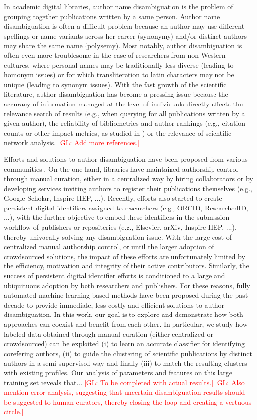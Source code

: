 \documentclass{article}
\newcommand{\glnote}[1]{\textcolor{red}{[GL: #1]}}
\begin{document}
In academic digital libraries, author name disambiguation is the problem of
grouping together publications written by a same person.  Author name
disambiguation is often a difficult problem because an author may use different
spellings or name variants across her career (synonymy) and/or distinct authors may
share the same name (polysemy). Most notably, author disambiguation is often even more
troublesome in the case of researchers from non-Western cultures, where
personal names may be traditionally less diverse (leading to homonym issues) or
for which transliteration to latin characters may not be unique (leading to
synonym issues). With the fast growth of the scientific literature, author
disambiguation has become a pressing issue because the accuracy of information
managed at the level of individuals directly affects the relevance search of
results (e.g., when querying for all publications written by a given author),
the reliability of bibliometrics and author rankings (e.g., citation counts or other impact
metrics, as studied in \citep{strotmann2012author}) or the relevance of scientific network analysis.
\glnote{Add more references.}

Efforts and solutions to author disambiguation have been proposed from various
communities \citep{liu2014author}. On the one hand, libraries have maintained
authorship control through manual curation, either in a centralized way by
hiring collaborators or by developing services inviting authors to register
their publications themselves (e.g., Google Scholar, Inspire-HEP, ...).
Recently, efforts also started to create persistent digital identifiers
assigned to researchers (e.g., ORCID, ResearchedID, ...), with the further
objective to embed these identifiers in the submission workflow of publishers
or repositeries (e.g., Elsevier, arXiv, Inspire-HEP, ...), thereby univocally
solving any disambiguation issue. With the large cost of centralized manual
authorship control, or until the larger adoption of crowdsourced solutions, the
impact of these efforts are unfortunately limited by the efficiency, motivation
and integrity of their active contributors. Similarly, the success of
persistent digital identifier efforts is conditioned to a large and ubiquituous
adoption by both researchers and publishers. For these reasons, fully automated
machine learning-based methods have been proposed during the past decade to
provide immediate, less costly and efficient solutions to author
disambiguation. In this work, our goal is to explore and demonstrate how both
approaches can coexist and benefit from each other.  In particular, we study
how labeled data obtained through manual curation (either centralized or
crowdsourced) can be exploited (i) to learn an accurate classifier for
identifying corefering authors, (ii) to guide the clustering of scientific
publications by distinct authors in a semi-supervised way and finally (iii) to
match the resulting clusters with existing profiles. Our analysis of parameters
and features on this large training set reveals that... \glnote{To be completed
with actual results.} \glnote{Also mention error analysis, suggesting that
uncertain disambiguation results should be suggested to human curators, thereby
closing the loop and creating a vertuous circle.}
\end{document}
